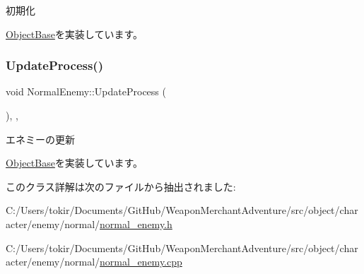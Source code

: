 初期化 



\mbox{\hyperlink{class_object_base_af133f36f2bca1dcfd962e2cfac61ab51}{Object\+Base}}を実装しています。

\mbox{\label{class_normal_enemy_a371a6bef4feaeb0b47e1ab61dead7b77}} 
\subsubsection{\texorpdfstring{Update\+Process()}{UpdateProcess()}}
{\footnotesize\ttfamily void Normal\+Enemy\+::\+Update\+Process (\begin{DoxyParamCaption}{ }\end{DoxyParamCaption})\hspace{0.3cm}{\ttfamily [final]}, {\ttfamily [protected]}, {\ttfamily [virtual]}}



エネミーの更新 



\mbox{\hyperlink{class_object_base_a8b5b72b363a419767efde0b0e692ea95}{Object\+Base}}を実装しています。



このクラス詳解は次のファイルから抽出されました\+:\begin{DoxyCompactItemize}
\item 
C\+:/\+Users/tokir/\+Documents/\+Git\+Hub/\+Weapon\+Merchant\+Adventure/src/object/character/enemy/normal/\mbox{\hyperlink{normal__enemy_8h}{normal\+\_\+enemy.\+h}}\item 
C\+:/\+Users/tokir/\+Documents/\+Git\+Hub/\+Weapon\+Merchant\+Adventure/src/object/character/enemy/normal/\mbox{\hyperlink{normal__enemy_8cpp}{normal\+\_\+enemy.\+cpp}}\end{DoxyCompactItemize}
